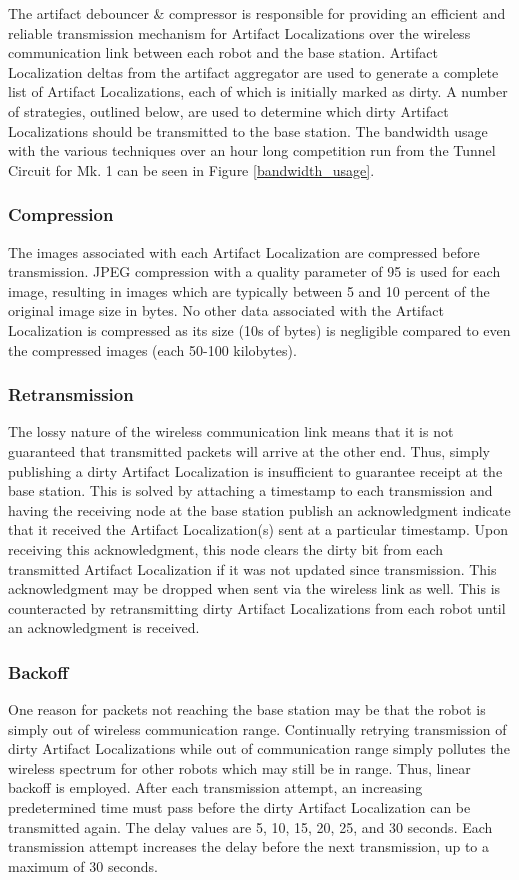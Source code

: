 The artifact debouncer \& compressor is responsible for providing an efficient and reliable transmission mechanism for Artifact Localizations over the wireless communication link between each robot and the base station. Artifact Localization deltas from the artifact aggregator are used to generate a complete list of Artifact Localizations, each of which is initially marked as dirty. A number of strategies, outlined below, are used to determine which dirty Artifact Localizations should be transmitted to the base station. The bandwidth usage with the various techniques over an hour long competition run from the Tunnel Circuit for Mk. 1 can be seen in Figure \ref{bandwidth_usage}.

\subsubsection{Compression}
The images associated with each Artifact Localization are compressed before transmission. JPEG compression with a quality parameter of 95 is used for each image, resulting in images which are typically between 5 and 10 percent of the original image size in bytes. No other data associated with the Artifact Localization is compressed as its size (10s of bytes) is negligible compared to even the compressed images (each 50-100 kilobytes).
	
\subsubsection{Retransmission} 
The lossy nature of the wireless communication link means that it is not guaranteed that transmitted packets will arrive at the other end. Thus, simply publishing a dirty Artifact Localization is insufficient to guarantee receipt at the base station. This is solved by attaching a timestamp to each transmission and having the receiving node at the base station publish an acknowledgment indicate that it received the Artifact Localization(s) sent at a particular timestamp. Upon receiving this acknowledgment, this node clears the dirty bit from each transmitted Artifact Localization if it was not updated since transmission. This acknowledgment may be dropped when sent via the wireless link as well. This is counteracted by retransmitting dirty Artifact Localizations from each robot until an acknowledgment is received.
	
\subsubsection{Backoff}
One reason for packets not reaching the base station may be that the robot is simply out of wireless communication range. Continually retrying transmission of dirty Artifact Localizations while out of communication range simply pollutes the wireless spectrum for other robots which may still be in range. Thus, linear backoff is employed. After each transmission attempt, an increasing predetermined time must pass before the dirty Artifact Localization can be transmitted again. The delay values are 5, 10, 15, 20, 25, and 30 seconds. Each transmission attempt increases the delay before the next transmission, up to a maximum of 30 seconds.
	
